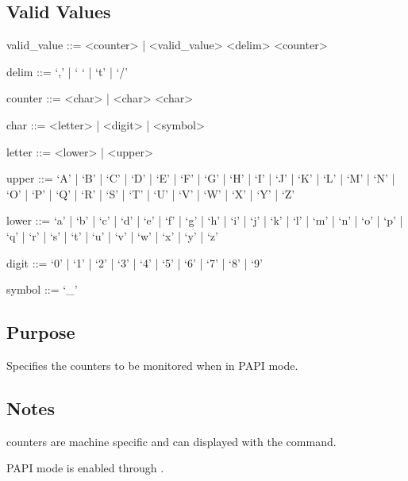 \documentclass[letterpaper,10pt,english]{sphinxmanual}
\begin{document}
\subsection{Valid Values}
\label{\detokenize{flag/flag:id282}}
\begin{DUlineblock}{0em}
\item[] valid\_value ::= \textless{}counter\textgreater{} | \textless{}valid\_value\textgreater{} \textless{}delim\textgreater{} \textless{}counter\textgreater{}
\item[] delim ::= ‘,’ | ‘ ‘ | ‘t’ | ‘/’
\item[] counter ::= \textless{}char\textgreater{} | \textless{}char\textgreater{} \textless{}char\textgreater{}
\item[] char ::= \textless{}letter\textgreater{} | \textless{}digit\textgreater{} | \textless{}symbol\textgreater{}
\item[] letter ::= \textless{}lower\textgreater{} | \textless{}upper\textgreater{}
\item[] upper ::= ‘A’ | ‘B’ | ‘C’ | ‘D’ | ‘E’ | ‘F’ | ‘G’ | ‘H’ | ‘I’ | ‘J’ | ‘K’ | ‘L’ | ‘M’ | ‘N’ | ‘O’ | ‘P’ | ‘Q’ | ‘R’ | ‘S’ | ‘T’ | ‘U’ | ‘V’ | ‘W’ | ‘X’ | ‘Y’ | ‘Z’
\item[] lower ::= ‘a’ | ‘b’ | ‘c’ | ‘d’ | ‘e’ | ‘f’ | ‘g’ | ‘h’ | ‘i’ | ‘j’ | ‘k’ | ‘l’ | ‘m’ | ‘n’ | ‘o’ | ‘p’ | ‘q’ | ‘r’ | ‘s’ | ‘t’ | ‘u’ | ‘v’ | ‘w’ | ‘x’ | ‘y’ | ‘z’
\item[] digit ::= ‘0’ | ‘1’ | ‘2’ | ‘3’ | ‘4’ | ‘5’ | ‘6’ | ‘7’ | ‘8’ | ‘9’
\item[] symbol ::= ‘\_’
\end{DUlineblock}


\subsection{Purpose}
\label{\detokenize{flag/flag:id283}}
\sphinxAtStartPar
Specifies the counters to be monitored when in PAPI mode.


\subsection{Notes}
\label{\detokenize{flag/flag:id284}}
\sphinxAtStartPar
{} counters are machine specific and can displayed with the  command.

\sphinxAtStartPar
PAPI mode is enabled through {\hyperref[\detokenize{flag/flag:dr-hook-opt}]{}}.
\end{document}
